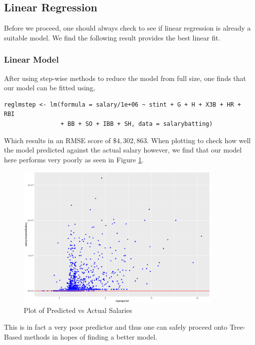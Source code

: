 \documentclass[11pt,a4paper]{report}
\begin{document}
\subsection{Linear Regression}
Before we proceed, one should always check to see if linear regression is already a suitable model.
We find the following result provides the best linear fit.
\subsubsection{Linear Model}
After using step-wise methods to reduce the model from full size, one finds that our model can be fitted using,
\begin{verbatim}
reglmstep <- lm(formula = salary/1e+06 ~ stint + G + H + X3B + HR + RBI  
                + BB + SO + IBB + SH, data = salarybatting)
\end{verbatim}
Which results in an RMSE score of $\$4,302,863$.
When plotting to check how well the model predicted against the actual salary however, we find that our model here performs very poorly as seen in Figure \ref{fig:lmmodel}.
\begin{figure}
    \centering
    \includegraphics[width = 10cm]{reportcharts/salarylmcomp.pdf}
    \caption{Plot of Predicted vs Actual Salaries}
    \label{fig:lmmodel}
\end{figure}
This is in fact a very poor predictor and thus one can safely proceed onto Tree-Based methods in hopes of finding a better model.
\end{document}
